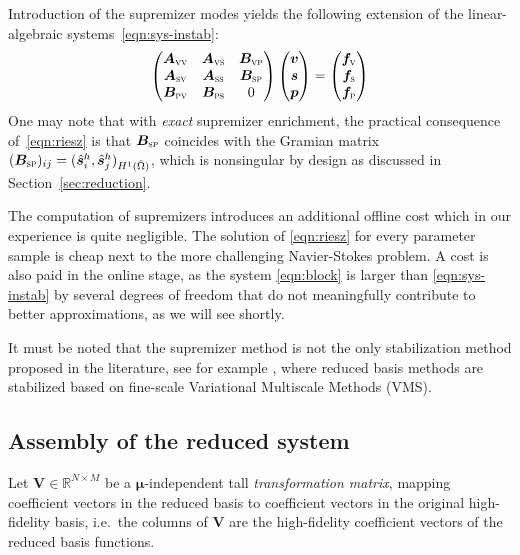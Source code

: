 \documentclass[onecolumn, twoside, a4paper, 11pt]{article}
\begin{document}
Introduction of the supremizer modes yields the following extension of the linear-algebraic
systems~\eqref{eqn:sys-instab}:
%
\begin{equation}
  \label{eqn:block}
  \begin{pmatrix}
    \bm A_\textsc{vv} & \bm A_\textsc{vs} & \bm B_\textsc{vp} \\
    \bm A_\textsc{sv} & \bm A_\textsc{ss} & \bm B_\textsc{sp} \\
    \bm B_\textsc{pv} & \bm B_\textsc{ps} & 0 \end{pmatrix}
  \begin{pmatrix} \bm v \\ \bm s \\ \bm p \end{pmatrix}
  =
  \begin{pmatrix} \bm f_\textsc{v} \\ \bm f_\textsc{s} \\ \bm f_\textsc{p} \end{pmatrix}
\end{equation}
%
One may note that with \emph{exact} supremizer enrichment, the practical
consequence of~\eqref{eqn:riesz} is that $\bm B_\textsc{sp}$ coincides
with the Gramian matrix $\smash[t]{(\bm B_\textsc{sp})_{ij}=( \hat{\bm s}^h_i, \hat{\bm s}^h_j )_{H^1(\hat{\Omega})}}$,
which is nonsingular by design as discussed in Section~\ref{sec:reduction}.

The computation of supremizers introduces an additional offline cost which in
our experience is quite negligible. The solution of \eqref{eqn:riesz} for every
parameter sample is cheap next to the more challenging Navier-Stokes problem. A
cost is also paid in the online stage, as the system \eqref{eqn:block} is larger
than \eqref{eqn:sys-instab} by several degrees of freedom that do not
meaningfully contribute to better approximations, as we will see shortly.

It must be noted that the supremizer method is not the only stabilization method
proposed in the literature, see for example
\cite{Weller2008nml,Bergmann2009erp}, where reduced basis methods are stabilized
based on fine-scale Variational Multiscale Methods (VMS).


\subsection{Assembly of the reduced system}
Let $\bm V \in \mathbb{R}^{N \times M}$ be a $\bm \mu$-independent
tall \emph{transformation matrix}, mapping coefficient vectors in the
reduced basis to coefficient vectors in the original high-fidelity
basis, i.e.~the columns of $\bm V$ are the high-fidelity coefficient
vectors of the reduced basis functions.
\end{document}
